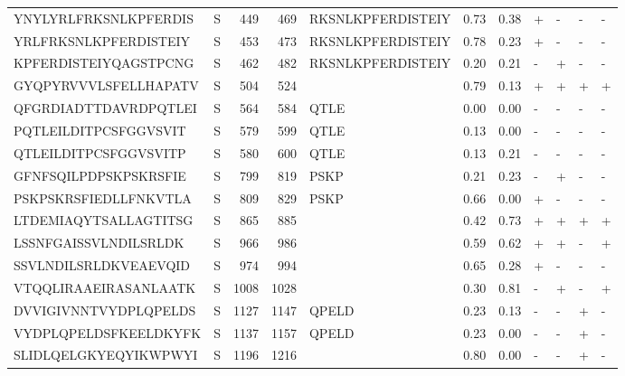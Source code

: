 \begin{tabular}{llrrlrrllll}
YNYLYRLFRKSNLKPFERDIS &       S &    449 &   469 &  RKSNLKPFERDISTEIY &            0.73 &             0.38 &      + &       - &      - &       - \\
YRLFRKSNLKPFERDISTEIY &       S &    453 &   473 &  RKSNLKPFERDISTEIY &            0.78 &             0.23 &      + &       - &      - &       - \\
KPFERDISTEIYQAGSTPCNG &       S &    462 &   482 &  RKSNLKPFERDISTEIY &            0.20 &             0.21 &      - &       + &      - &       - \\
GYQPYRVVVLSFELLHAPATV &       S &    504 &   524 &                    &            0.79 &             0.13 &      + &       + &      + &       + \\
QFGRDIADTTDAVRDPQTLEI &       S &    564 &   584 &               QTLE &            0.00 &             0.00 &      - &       - &      - &       - \\
PQTLEILDITPCSFGGVSVIT &       S &    579 &   599 &               QTLE &            0.13 &             0.00 &      - &       - &      - &       - \\
QTLEILDITPCSFGGVSVITP &       S &    580 &   600 &               QTLE &            0.13 &             0.21 &      - &       - &      - &       - \\
GFNFSQILPDPSKPSKRSFIE &       S &    799 &   819 &               PSKP &            0.21 &             0.23 &      - &       + &      - &       - \\
PSKPSKRSFIEDLLFNKVTLA &       S &    809 &   829 &               PSKP &            0.66 &             0.00 &      + &       - &      - &       - \\
LTDEMIAQYTSALLAGTITSG &       S &    865 &   885 &                    &            0.42 &             0.73 &      + &       + &      + &       + \\
LSSNFGAISSVLNDILSRLDK &       S &    966 &   986 &                    &            0.59 &             0.62 &      + &       + &      - &       + \\
SSVLNDILSRLDKVEAEVQID &       S &    974 &   994 &                    &            0.65 &             0.28 &      + &       - &      - &       - \\
VTQQLIRAAEIRASANLAATK &       S &   1008 &  1028 &                    &            0.30 &             0.81 &      - &       + &      - &       + \\
DVVIGIVNNTVYDPLQPELDS &       S &   1127 &  1147 &              QPELD &            0.23 &             0.13 &      - &       - &      + &       - \\
VYDPLQPELDSFKEELDKYFK &       S &   1137 &  1157 &              QPELD &            0.23 &             0.00 &      - &       - &      + &       - \\
SLIDLQELGKYEQYIKWPWYI &       S &   1196 &  1216 &                    &            0.80 &             0.00 &      - &       - &      + &       - \\
\bottomrule
\end{tabular}
